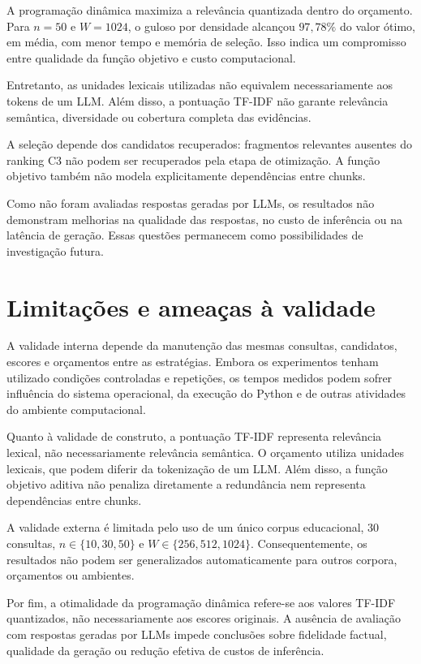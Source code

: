\documentclass[11pt,a4paper]{article}
\theoremstyle{plain}
\theoremstyle{definition}
\theoremstyle{plain}
\begin{document}
A programação dinâmica maximiza a relevância
quantizada dentro do orçamento. Para $n=50$
e $W=1024$, o guloso por densidade alcançou
$97{,}78\%$ do valor ótimo, em média,
com menor tempo e memória de seleção.
Isso indica um compromisso entre qualidade
da função objetivo e custo computacional.

Entretanto, as unidades lexicais utilizadas
não equivalem necessariamente aos tokens de
um LLM. Além disso, a pontuação TF-IDF não
garante relevância semântica, diversidade
ou cobertura completa das evidências.

A seleção depende dos candidatos recuperados:
fragmentos relevantes ausentes do ranking C3
não podem ser recuperados pela etapa de
otimização. A função objetivo também não
modela explicitamente dependências entre chunks.

Como não foram avaliadas respostas geradas
por LLMs, os resultados não demonstram
melhorias na qualidade das respostas, no
custo de inferência ou na latência de geração.
Essas questões permanecem como possibilidades
de investigação futura.




\section{Limitações e ameaças à validade}

A validade interna depende da manutenção das
mesmas consultas, candidatos, escores e
orçamentos entre as estratégias. Embora
os experimentos tenham utilizado condições
controladas e repetições, os tempos medidos
podem sofrer influência do sistema operacional,
da execução do Python e de outras atividades
do ambiente computacional.

Quanto à validade de construto, a pontuação
TF-IDF representa relevância lexical, não
necessariamente relevância semântica.
O orçamento utiliza unidades lexicais,
que podem diferir da tokenização de um LLM.
Além disso, a função objetivo aditiva não
penaliza diretamente a redundância nem
representa dependências entre chunks.

A validade externa é limitada pelo uso de
um único corpus educacional, 30 consultas,
$n\in\{10,30,50\}$ e
$W\in\{256,512,1024\}$.
Consequentemente, os resultados não podem
ser generalizados automaticamente para
outros corpora, orçamentos ou ambientes.

Por fim, a otimalidade da programação dinâmica
refere-se aos valores TF-IDF quantizados,
não necessariamente aos escores originais.
A ausência de avaliação com respostas
geradas por LLMs impede conclusões sobre
fidelidade factual, qualidade da geração
ou redução efetiva de custos de inferência.
\end{document}
